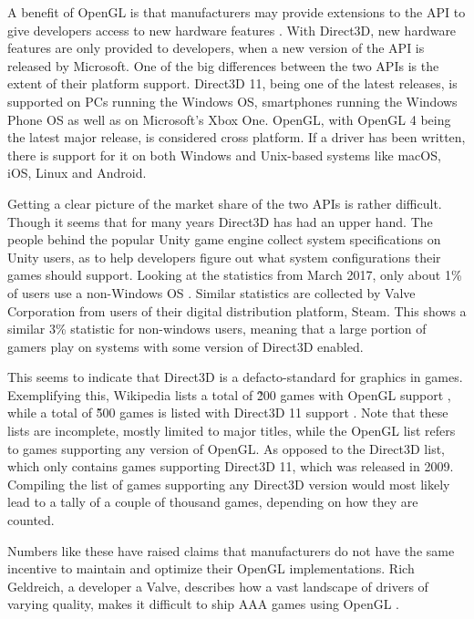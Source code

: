 A benefit of OpenGL is that manufacturers may provide extensions to the \gls{API} to give developers access to new hardware features \cite{openGLExtensions}.
With Direct3D, new hardware features are only provided to developers, when a new version of the \gls{API} is released by Microsoft. 
One of the big differences between the two \glspl{API} is the extent of their platform support.
Direct3D 11, being one of the latest releases, is supported on PCs running the Windows \gls{OS}, smartphones running the Windows Phone \gls{OS} as well as on Microsoft’s Xbox One.
OpenGL, with OpenGL 4 being the latest major release, is considered cross platform.
If a driver has been written, there is support for it on both Windows and Unix-based systems like macOS, iOS, Linux and Android. 

Getting a clear picture of the market share of the two \glspl{API} is rather difficult.
Though it seems that for many years Direct3D has had an upper hand.
The people behind the popular Unity game engine collect system specifications on Unity users, as to help developers figure out what system configurations their games should support.
Looking at the statistics from March 2017, only about 1\% of users use a non-Windows \gls{OS} \cite{unityStats}.
Similar statistics are collected by Valve Corporation from users of their digital distribution platform, Steam.
This shows a similar 3\% statistic for non-windows users\cite{steamStats}, meaning that a large portion of gamers play on systems with some version of Direct3D enabled.

This seems to indicate that Direct3D is a defacto-standard for graphics in games. 
Exemplifying this, Wikipedia lists a total of \~200 games with OpenGL support \cite{wikiOpenGLGames}, while a total of \~500 games is listed with Direct3D 11 support \cite{
DX11Games}. 
Note that these lists are incomplete, mostly limited to major titles, while the OpenGL list refers to games supporting any version of OpenGL.
As opposed to the Direct3D list, which only contains games supporting Direct3D 11, which was released in 2009.
Compiling the list of games supporting any Direct3D version would most likely lead to a tally of a couple of thousand games, depending on how they are counted.
   
Numbers like these have raised claims that manufacturers do not have the same incentive to maintain and optimize their OpenGL implementations.
Rich Geldreich, a developer a Valve, describes how a vast landscape of drivers of varying quality, makes it difficult to ship AAA games using OpenGL \cite{openGLDriverQuality}.
 
